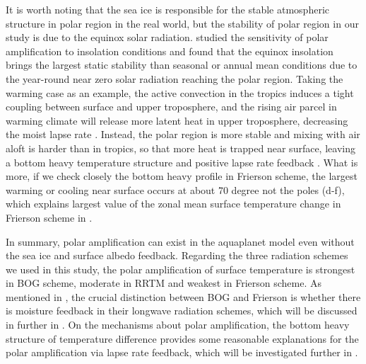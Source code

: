 It is worth noting that the sea ice is responsible for the stable atmospheric structure in polar region in the real world, but the stability of polar region in our study is due to the equinox solar radiation. \cite{Kim2018} studied the sensitivity of polar amplification to insolation conditions and found that the equinox insolation brings the largest static stability than seasonal or annual mean conditions due to the year-round near zero solar radiation reaching the polar region. Taking the warming case as an example, the active convection in the tropics induces a tight coupling between surface and upper troposphere, and the rising air parcel in warming climate will release more latent heat in upper troposphere, decreasing the moist lapse rate \citep{Graversen2014}. Instead, the polar region is more stable and mixing with air aloft is harder than in tropics, so that more heat is trapped near surface, leaving a bottom heavy temperature structure and positive lapse rate feedback \citep{Pithan2014}. What is more, if we check closely the bottom heavy profile in Frierson scheme, the largest warming or cooling near surface occurs at about 70 degree not the poles (d-f), which explains largest value of the zonal mean surface temperature change in Frierson scheme in .


In summary, polar amplification can exist in the aquaplanet model even without the sea ice and surface albedo feedback. Regarding the three radiation schemes we used in this study, the polar amplification of surface temperature is strongest in BOG scheme, moderate in RRTM and weakest in Frierson scheme. As mentioned in , the crucial distinction between BOG and Frierson is whether there is moisture feedback in their longwave radiation schemes, which will be discussed in further in . On the mechanisms about polar amplification, the bottom heavy structure of temperature difference provides some reasonable explanations for the polar amplification via lapse rate feedback, which will be investigated further in .

